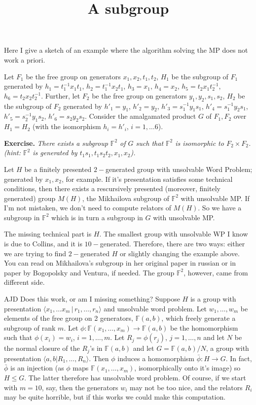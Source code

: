\documentclass[a4paper,12pt]{article}
\title{A subgroup}
\numberwithin{equation}{section}
\numberwithin{figure}{section}
\newcommand{\FF}{\ensuremath{\mathbb{F}}}
\newcommand{\la}{\langle}
\newcommand{\ra}{\rangle}
\newcommand{\maps}{\rightarrow}
\newenvironment{ajd1}{\noindent\color{red} AJD }{}
\newcommand{\ajd}[1]{\begin{ajd1} #1 \end{ajd1}}
\begin{document}
Here I give a sketch of an example where the algorithm solving the MP does not work a priori.


Let $F_1$ be the free group on generators $x_1,x_2, t_1, t_2$,
$H_1$ be the subgroup of $F_1$ generated by 
$h_1= t_1^{-1} x_1 t_1$, 
$h_2 = t_1^{-1} x_2 t_1$, 
$h_3 =x_1$, 
$h_4 = x_2$,
$h_5= t_2 x_1 t_2^{-1}$, 
$h_6 = t_2 x_2 t_2^{-1}$.
Further, let $F_2$ be the free group on generators $y_1, y_2, s_1, s_2$,
$H_2$ be the subgroup of $F_2$ generated by 
$h'_1= y_1$, 
$h'_2 = y_2$, 
$h'_3 = s_1^{-1} y_1 s_1 $, 
$h'_4 = s_1^{-1} y_2 s_1$,
$h'_5= s_2^{-1} y_1 s_2$, 
$h'_6 = s_2 y_2 s_2$.
Consider the amalgamated product $G$ of $F_1, F_2$ over $H_1=H_2$ (with the isomorphism $h_i = h'_i$, $i = 1,\ldots 6$).

{\bf Exercise.} {\it There exists a subgroup $\mathbb{F}^2$ of $G$ such that $\mathbb{F}^2$ is isomorphic to $F_2 \times F_2$.
(hint: $\mathbb{F}^2$ is generated by $t_1s_1, t_1s_2t_2, x_1, x_2$).}

Let $H$ be a finitely presented $2-$generated group with unsolvable Word Problem; generated by $x_1, x_2$, for example. If it's presentation satisfies some technical conditions, then there exists a rescursively presented (moreover, finitely generated) group $M(H)$, the Mikhailova subgroup of $\mathbb{F}^2$ with unsolvable MP.
If I'm not mistaken, we don't need to compute relators of $M(H)$. So we have a subgroup in $\mathbb{F}^2$ which is in turn a subgroup in $G$ with unsolvable MP.

The missing technical part is $H$. The smallest group with unsolvable WP I know is due to Collins, and it is $10-$generated. Therefore, there are two ways: either we are trying to find $2-$generated $H$ or slightly changing the example above.
You can read on Mikhailova's subgroup in her original paper in russian or in paper by Bogopolsky and Ventura, if needed. 
The group $\mathbb{F}^2$, however, came from different side.

\ajd{Does this work, or am I missing something? Suppose $H$ is a group
with presentation $\la x_1, \ldots x_m\,|\, r_1,\ldots ,r_n\ra$ and unsolvable
word problem. Let $w_1, \ldots , w_m$ be elements of the free group on
2 generators, $\FF(a,b)$, which freely generate a subgroup of rank $m$. 
Let $\phi:\FF(x_1,\ldots, x_m) \maps \FF(a,b)$ 
be the homomorphism such that $\phi(x_i)=w_i$, 
$i=1,\ldots, m$. 
Let $R_j=\phi(r_j)$, $j=1,\ldots ,n$ and let $N$ be the normal closure of 
the $R_j$'s in $\FF(a,b)$ and let $G=\FF(a,b)/N$, a group with presentation
$\la a, b|R_1, \ldots, R_n\ra$. 
Then $\phi$ induces a homomorphism $\bar\phi:H\maps  G$. 
In fact, $\bar\phi$ is an injection (as $\phi$ maps $\FF(x_1,\ldots ,x_{m})$, 
isomorphically onto it's image) so $H\le G$. The latter therefore has
unsolvable word problem. Of course, if we start with $m=10$, say, then 
 the generators $w_i$ may not be too nice,
and the relators $R_i$ may be quite horrible, but if this works we could 
make this computation.}
\end{document}
